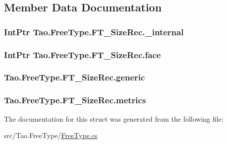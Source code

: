 \subsection{Member Data Documentation}
\hypertarget{struct_tao_1_1_free_type_1_1_f_t___size_rec_a54c3e000ab3bfb2623a3baab561d67c0}{
\subsubsection[{\_\-internal}]{\setlength{\rightskip}{0pt plus 5cm}IntPtr {\bf Tao.FreeType.FT\_\-SizeRec.\_\-internal}}}
\label{struct_tao_1_1_free_type_1_1_f_t___size_rec_a54c3e000ab3bfb2623a3baab561d67c0}
\hypertarget{struct_tao_1_1_free_type_1_1_f_t___size_rec_a2bd698fb859d9e4771942466f37279d2}{
\subsubsection[{face}]{\setlength{\rightskip}{0pt plus 5cm}IntPtr {\bf Tao.FreeType.FT\_\-SizeRec.face}}}
\label{struct_tao_1_1_free_type_1_1_f_t___size_rec_a2bd698fb859d9e4771942466f37279d2}
\hypertarget{struct_tao_1_1_free_type_1_1_f_t___size_rec_ab76456966c6a2035db370378576f9a45}{
\subsubsection[{generic}]{ {\bf Tao.FreeType.FT\_\-SizeRec.generic}}}
\label{struct_tao_1_1_free_type_1_1_f_t___size_rec_ab76456966c6a2035db370378576f9a45}
\hypertarget{struct_tao_1_1_free_type_1_1_f_t___size_rec_a4b668712adf11e94823a98385262067f}{
\subsubsection[{metrics}]{ {\bf Tao.FreeType.FT\_\-SizeRec.metrics}}}
\label{struct_tao_1_1_free_type_1_1_f_t___size_rec_a4b668712adf11e94823a98385262067f}


The documentation for this struct was generated from the following file:\begin{DoxyCompactItemize}
\item 
src/Tao.FreeType/\hyperlink{_free_type_8cs}{FreeType.cs}\end{DoxyCompactItemize}
